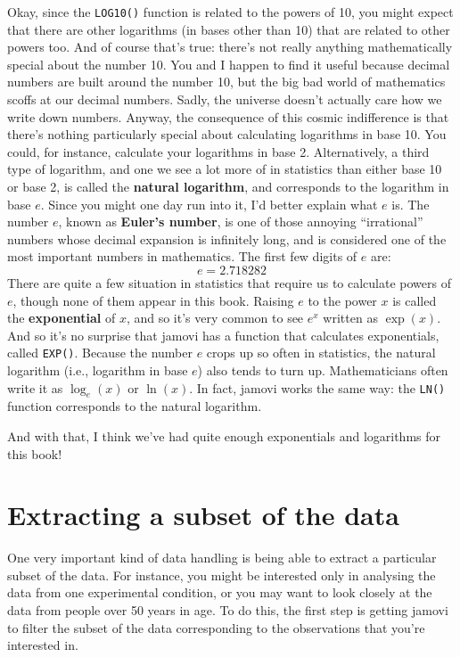 \documentclass[
]{book}
\begin{document}
Okay, since the \texttt{LOG10()} function is related to the powers of 10, you might expect that there are other logarithms (in bases other than 10) that are related to other powers too. And of course that's true: there's not really anything mathematically special about the number 10. You and I happen to find it useful because decimal numbers are built around the number 10, but the big bad world of mathematics scoffs at our decimal numbers. Sadly, the universe doesn't actually care how we write down numbers. Anyway, the consequence of this cosmic indifference is that there's nothing particularly special about calculating logarithms in base 10. You could, for instance, calculate your logarithms in base 2. Alternatively, a third type of logarithm, and one we see a lot more of in statistics than either base 10 or base 2, is called the {\textbf{natural logarithm}}, and corresponds to the logarithm in base \(e\). Since you might one day run into it, I'd better explain what \(e\) is. The number \(e\), known as {\textbf{Euler's number}}, is one of those annoying ``irrational'' numbers whose decimal expansion is infinitely long, and is considered one of the most important numbers in mathematics. The first few digits of \(e\) are:
\[
e = 2.718282 
\]
There are quite a few situation in statistics that require us to calculate powers of \(e\), though none of them appear in this book. Raising \(e\) to the power \(x\) is called the {\textbf{exponential}} of \(x\), and so it's very common to see \(e^x\) written as \(\exp(x)\). And so it's no surprise that jamovi has a function that calculates exponentials, called \texttt{EXP()}. Because the number \(e\) crops up so often in statistics, the natural logarithm (i.e., logarithm in base \(e\)) also tends to turn up. Mathematicians often write it as \(\log_e(x)\) or \(\ln(x)\). In fact, jamovi works the same way: the \texttt{LN()} function corresponds to the natural logarithm.

And with that, I think we've had quite enough exponentials and logarithms for this book!

\hypertarget{subset}{%
\section{Extracting a subset of the data}\label{subset}}

One very important kind of data handling is being able to extract a particular subset of the data. For instance, you might be interested only in analysing the data from one experimental condition, or you may want to look closely at the data from people over 50 years in age. To do this, the first step is getting jamovi to filter the subset of the data corresponding to the observations that you're interested in.
\end{document}
